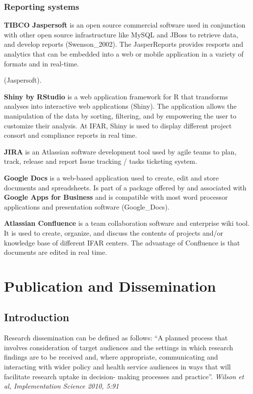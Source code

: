 \documentclass[]{book}
\begin{document}
\subsection{Reporting systems}\label{reporting-systems}

\textbf{TIBCO Jaspersoft} is an open source commercial software used in
conjunction with other open source infrastructure like MySQL and JBoss
to retrieve data, and develop reports (Swenson\_2002). The JasperReports
provides resports and analytics that can be embedded into a web or
mobile application in a variety of formats and in real-time.

(Jaspersoft).

\textbf{Shiny by RStudio} is a web application framework for R that
transforms analyses into interactive web applications (Shiny). The
application allows the manipulation of the data by sorting, filtering,
and by empowering the user to customize their analysis. At IFAR, Shiny
is used to display different project consort and compliance reports in
real time.

\textbf{JIRA} is an Atlassian software development tool used by agile
teams to plan, track, release and report Issue tracking / tasks
ticketing system.

\textbf{Google Docs} is a web-based application used to create, edit and
store documents and spreadsheets. Is part of a package offered by and
associated with \textbf{Google Apps for Business} and is compatible with
most word processor applications and presentation software
(Google\_Docs).

\textbf{Atlassian Confluence} is a team collaboration software and
enterprise wiki tool. It is used to create, organize, and discuss the
contents of projects and/or knowledge base of different IFAR centers.
The advantage of Confluence is that documents are edited in real time.

\chapter{Publication and
Dissemination}\label{publication-and-dissemination}

\section{Introduction}\label{introduction-3}

Research dissemination can be defined as follows: ``A planned process
that involves consideration of target audiences and the settings in
which research findings are to be received and, where appropriate,
communicating and interacting with wider policy and health service
audiences in ways that will facilitate research uptake in decision-
making processes and practice''. \emph{Wilson et al, Implementation
Science 2010, 5:91}
\end{document}
